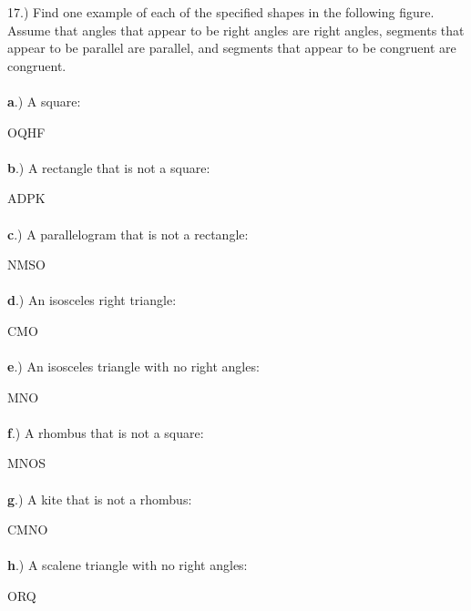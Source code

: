 \documentclass[12pt]{article}
\begin{document}
{\setlength{\parindent}{0cm}
17.) Find one example of each of the specified shapes in the following figure. Assume that angles that appear to be right angles are right angles, segments that appear to be parallel are parallel, and segments that appear to be congruent are congruent. 
\paragraph{}\textbf{a}.) A square: \begin{center} OQHF \end{center} 
\paragraph{}\textbf{b}.) A rectangle that is not a square: \begin{center} ADPK \end{center} 
\paragraph{}\textbf{c}.) A parallelogram that is not a rectangle: \begin{center} NMSO \end{center} 
\paragraph{}\textbf{d}.) An isosceles right triangle: \begin{center} CMO \end{center} 
\paragraph{}\textbf{e}.) An isosceles triangle with no right angles: \begin{center} MNO \end{center} 
\paragraph{}\textbf{f}.) A rhombus that is not a square:\begin{center} MNOS \end{center} 
\paragraph{}\textbf{g}.) A kite that is not a rhombus: \begin{center} CMNO \end{center} 
\paragraph{}\textbf{h}.) A scalene triangle with no right angles: \begin{center} ORQ \end{center} 
}
\end{document}
